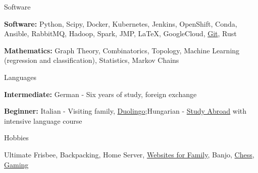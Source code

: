 

\begin{cventries}

  \cventry
    {Software} %
    {} %
    {} %
    {} %
    {
      \begin{cvitems} %
        \item {\textbf{Software:} Python, Scipy, Docker, Kubernetes, Jenkins, OpenShift, Conda, Ansible, RabbitMQ, Hadoop, Spark, JMP, \LaTeX, GoogleCloud, \href{https://github.com/severalfew}{Git}, Rust}
        \item {\textbf{Mathematics:} Graph Theory, Combinatorics, Topology, Machine Learning (regression and classification), Statistics, Markov Chains}
      \end{cvitems}
    }
  \cventry
    {Languages} %
    {} %
    {} %
    {} %
    {
      \begin{cvitems} %
        \item {\textbf{Intermediate:} German - Six years of study, foreign exchange}
        \item {\textbf{Beginner:} Italian - Visiting family, \href{https://www.duolingo.com/profile/grey_ranger}{Duolingo};\quad Hungarian - \href{https://www.budapestsemesters.com}{Study Abroad} with intensive language course}
      \end{cvitems}
    }
  \cventry
    {Hobbies} %
    {} %
    {} %
    {} %
    {
      \begin{cvitems} %
        \item {Ultimate Frisbee, Backpacking, Home Server, \href{https://mallorynygard.com}{Websites for Family}, Banjo, \href{https://www.chess.com/member/grey_ranger}{Chess}, \href{https://steamcommunity.com/id/grey_ranger/}{Gaming}}
      \end{cvitems}
    }
\end{cventries}
